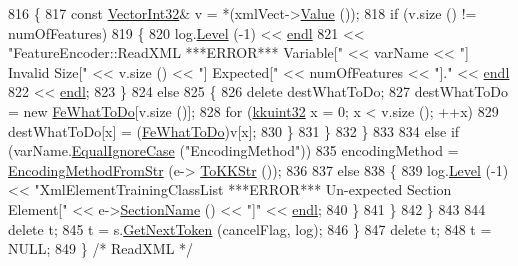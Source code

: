 \begin{DoxyCode}
816           \{
817             \textcolor{keyword}{const} \hyperlink{namespace_k_k_b_adf8a10085d231870d8a072046d6cba10}{VectorInt32}&  v = *(xmlVect->\hyperlink{class_k_k_b_1_1_xml_element_vector_int32_ab2877c6bbf603155fc89cb974bc02883}{Value} ());
818             \textcolor{keywordflow}{if}  (v.size () != numOfFeatures)
819             \{
820               log.\hyperlink{class_k_k_b_1_1_run_log_a32cf761d7f2e747465fd80533fdbb659}{Level} (-1) << \hyperlink{namespace_k_k_b_ad1f50f65af6adc8fa9e6f62d007818a8}{endl}
821                 << \textcolor{stringliteral}{"FeatureEncoder::ReadXML   ***ERROR***   Variable["} << varName << \textcolor{stringliteral}{"]  Invalid Size["} << 
      v.size () << \textcolor{stringliteral}{"]  Expected["} << numOfFeatures << \textcolor{stringliteral}{"]."} << \hyperlink{namespace_k_k_b_ad1f50f65af6adc8fa9e6f62d007818a8}{endl}
822                 << \hyperlink{namespace_k_k_b_ad1f50f65af6adc8fa9e6f62d007818a8}{endl};
823             \}
824             \textcolor{keywordflow}{else}
825             \{
826               \textcolor{keyword}{delete}  destWhatToDo;
827               destWhatToDo = \textcolor{keyword}{new} \hyperlink{namespace_k_k_m_l_l_aa7a52865d78241e93b30731e46f99b43}{FeWhatToDo}[v.size ()];
828               \textcolor{keywordflow}{for}  (\hyperlink{namespace_k_k_b_af8d832f05c54994a1cce25bd5743e19a}{kkuint32} x = 0;  x < v.size ();  ++x)
829                 destWhatToDo[x] = (\hyperlink{namespace_k_k_m_l_l_aa7a52865d78241e93b30731e46f99b43}{FeWhatToDo})v[x];
830             \}
831           \}
832         \}
833 
834         \textcolor{keywordflow}{else} \textcolor{keywordflow}{if}  (varName.\hyperlink{class_k_k_b_1_1_k_k_str_a562f9696417c53f66bc4088eac072ab5}{EqualIgnoreCase} (\textcolor{stringliteral}{"EncodingMethod"}))
835           encodingMethod = \hyperlink{namespace_k_k_m_l_l_a100cc09ba8368cc433f3f8643e3d0abb}{EncodingMethodFromStr} (e->
      \hyperlink{class_k_k_b_1_1_xml_element_a3028fc03b79509e6378749f6a8b426b9}{ToKKStr} ());
836 
837         \textcolor{keywordflow}{else}
838         \{
839           log.\hyperlink{class_k_k_b_1_1_run_log_a32cf761d7f2e747465fd80533fdbb659}{Level} (-1) << \textcolor{stringliteral}{"XmlElementTrainingClassList   ***ERROR***   Un-expected Section Element["}
       << e->\hyperlink{class_k_k_b_1_1_xml_element_a2b85dcb37a0f63bd7979d16d12296876}{SectionName} () << \textcolor{stringliteral}{"]"} << \hyperlink{namespace_k_k_b_ad1f50f65af6adc8fa9e6f62d007818a8}{endl};
840         \}
841       \}
842     \}
843 
844     \textcolor{keyword}{delete}  t;
845     t = s.\hyperlink{class_k_k_b_1_1_xml_stream_a87cc738b05c666cf5d5c25beaab477b4}{GetNextToken} (cancelFlag, log);
846   \}
847   \textcolor{keyword}{delete}  t;
848   t = NULL;
849 \}  \textcolor{comment}{/* ReadXML */}
\end{DoxyCode}
